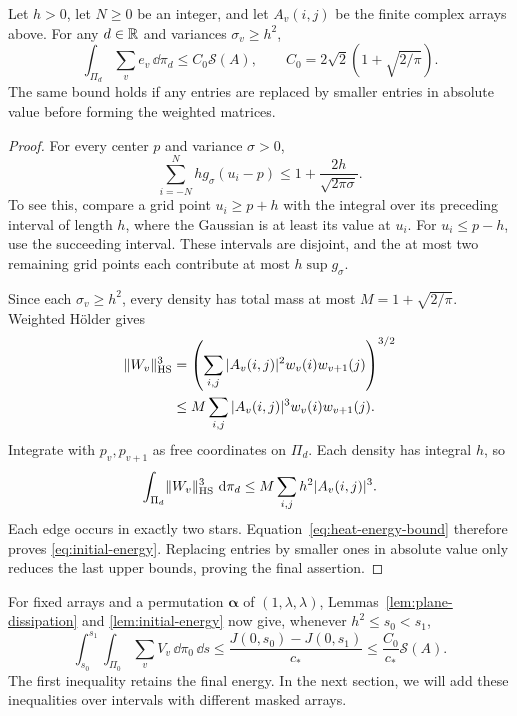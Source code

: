 \begin{lemma}\label{lem:initial-energy}
Let $h>0$, let $N\ge0$ be an integer, and let $A_v(i,j)$ be the finite complex arrays above.
For any $d\in\mathbb R$ and variances $\sigma_v\ge h^2$,
\begin{equation}\label{eq:initial-energy}
 \int_{\Pi_d}\sum_ve_v\,\dd\pi_d
 \le C_0\mathcal S(A),\qquad
 C_0=2\sqrt2\left(1+\sqrt{2/\pi}\right).
\end{equation}
The same bound holds if any entries are replaced by smaller entries in
absolute value before forming the weighted matrices.
\end{lemma}
\begin{proof}
For every center $p$ and variance $\sigma>0$,
\begin{equation}\label{eq:heat-mesh-mass}
 \sum_{i=-N}^Nh g_\sigma(u_i-p)
 \le1+\frac{2h}{\sqrt{2\pi\sigma}}.
\end{equation}
To see this, compare a grid point $u_i\ge p+h$ with the integral over its
preceding interval of length $h$, where the Gaussian is at least its
value at $u_i$. For $u_i\le p-h$, use the succeeding interval. These
intervals are disjoint, and the at most two remaining grid points each
contribute at most $h\sup g_\sigma$.

Since each $\sigma_v\ge h^2$, every density has total mass at most
$M=1+\sqrt{2/\pi}$. Weighted H\"older gives
\begin{align*}
 \lVert W_v\rVert_{\mathrm{HS}}^3
 &=\left(\sum_{i,j}|A_v(i,j)|^2w_v(i)w_{v+1}(j)\right)^{3/2}\\
 &\le M\sum_{i,j}|A_v(i,j)|^3w_v(i)w_{v+1}(j).
\end{align*}
Integrate with $p_v,p_{v+1}$ as free coordinates on $\Pi_d$. Each density
has integral $h$, so
\[
 \int_{\Pi_d}\lVert W_v\rVert_{\mathrm{HS}}^3\,\mathop{}\!\mathrm d\pi_d
 \le M\sum_{i,j}h^2|A_v(i,j)|^3.
\]
Each edge occurs in exactly two stars. Equation~\eqref{eq:heat-energy-bound}
therefore proves \eqref{eq:initial-energy}. Replacing entries by smaller
ones in absolute value only reduces the last upper bounds, proving the
final assertion.
\end{proof}

For fixed arrays and a permutation $\boldsymbol\alpha$ of
$(1,\lambda,\lambda)$, Lemmas~\ref{lem:plane-dissipation} and
\ref{lem:initial-energy} now give, whenever $h^2\le s_0<s_1$,
\[
 \int_{s_0}^{s_1}\int_{\Pi_0}\sum_vV_v\,\dd\pi_0\,\dd s
 \le\frac{J(0,s_0)-J(0,s_1)}{c_*}
 \le\frac{C_0}{c_*}\mathcal S(A).
\]
The first inequality retains the final energy. In the next section, we
will add these inequalities over intervals with different masked arrays.

